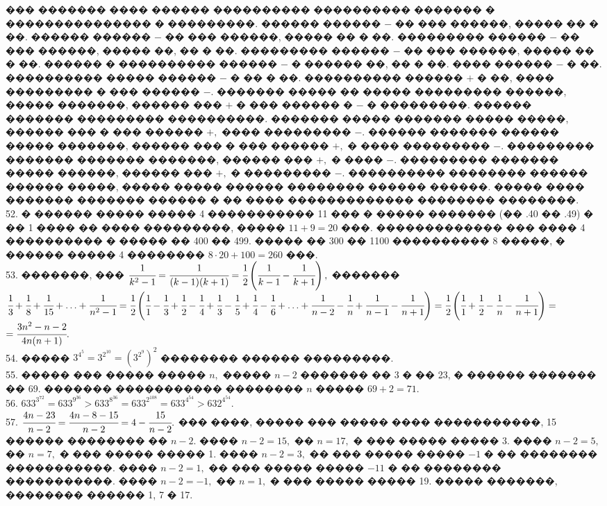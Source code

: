 \documentclass[12pt]{article}
\begin{document}
��� ������� ���� ������ ���������� ���������� ������� � ��������������� � ���������. ������ ������ $-$ �� ��� ������, ����� �� � ��. ������ ������ $-$ �� ��� ������, ����� �� � ��. ��������� ������ $-$ �� ��� ������, ����� ��, �� � ��. ��������� ������ $-$ �� ��� ������, ����� �� � ��. ������ � ���������� ������ $-$ � ������ ��, �� � ��. ���� ������ $-$ � ��. ���������� ����� ������ $-$ � �� � ��. ���������� ������ $+$ � ��, ���� ��������� � ��� ������ $-$. ������� ����� �� ����� ��������� ������, ����� �������, ������ ��� $+$ � ��� ������ � $-$ � ���������. ������ ������� ��������� ����������. ������� ����� ������� ����� �����, ������ ��� � ��� ������ $+,$ ���� ��������� $-.$ ������ ������� ������ ����� �������, ������ ��� � ��� ������ $+,$ � ���� ��������� $-.$ ��������� ������� ������� �������, ������ ��� $+,$ � ���� $-.$ ��������� ������� ����� ������, ������ ��� $+,$ � ��������� $-.$ ���������� �������� ������ ������ �����, ����� ����� ������ �������� ������ ������. ����� ���� ������� ������� ������ � �� ���� ������������� �������� ��������.\\
52. � ������ ����� ����� 4 ����������� 11 ��� � ����� ������� (�� .40 �� .49) � �� 1 ���� �� ���� ���������, ����� $11+9=20$ ���. ������������� ��� ���� 4 ���������� � ����� �� 400 �� 499. ����� �� 300 �� 1100 ���������� 8 �����, � ������ ����� 4 �������� $8\cdot20+100=260$ ���.\\
53. �������, ��� $\cfrac{1}{k^2-1}=\cfrac{1}{(k-1)(k+1)}=\cfrac{1}{2}\left(\cfrac{1}{k-1}-\cfrac{1}{k+1}\right),$ �������
$\cfrac{1}{3}+\cfrac{1}{8}+\cfrac{1}{15}+\ldots+\cfrac{1}{n^2-1}=\cfrac{1}{2}\left(\cfrac{1}{1}-\cfrac{1}{3}+\cfrac{1}{2}-\cfrac{1}{4}+
\cfrac{1}{3}-\cfrac{1}{5}+\cfrac{1}{4}-\cfrac{1}{6}+\ldots+\cfrac{1}{n-2}-\cfrac{1}{n}+\cfrac{1}{n-1}-\cfrac{1}{n+1}\right)=
\cfrac{1}{2}\left(\cfrac{1}{1}+\cfrac{1}{2}-\cfrac{1}{n}-\cfrac{1}{n+1}\right)=$\\$=\cfrac{3n^2-n-2}{4n(n+1)}.$\\
54. ����� $3^{4^5}=3^{2^{10}}=\left(3^{2^9}\right)^2$ �������� ������ ���������.\\
55. ����� ��� ����� ����� $n,$ ����� $n-2$ ������� �� 3 � �� 23, � ������ ������� �� 69. ������� ����������� �������� $n$ ����� $69+2=71.$\\
56. $633^{3^{72}}=633^{9^{36}}>633^{8^{36}}=633^{2^{108}}=633^{4^{54}}>632^{4^{54}}.$\\
57. $\cfrac{4n-23}{n-2}=\cfrac{4n-8-15}{n-2}=4-\cfrac{15}{n-2}.$ ��� ����, ����� ��� ����� ���� �����������, 15 ������ �������� �� $n-2.$ ���� $n-2=15,$ �� $n=17,$ � ��� ����� ����� 3. ���� $n-2=5,$ �� $n=7,$ � ��� ����� ����� 1. ���� $n-2=3,$ �� ��� ����� ����� $-1$ � �� �������� �����������. ���� $n-2=1,$ �� ��� ����� ����� $-11$ � �� �������� �����������. ���� $n-2=-1,$ �� $n=1,$ � ��� ����� ����� 19. ����� �������, �������� ������ 1, 7 � 17.\\
\end{document}
